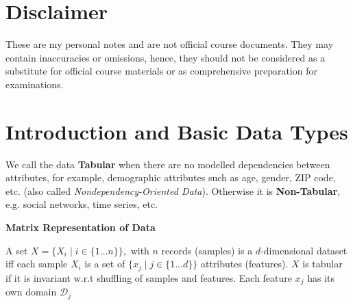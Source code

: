 \documentclass{article}
\begin{document}
\maketitle
\section*{Disclaimer}

These are my personal notes and are not official course documents. They may contain inaccuracies or omissions, hence, they should not be considered as a substitute for official course materials or as comprehensive preparation for examinations.

\tableofcontents

\clearpage
\section{Introduction and Basic Data Types}
We call the data \textbf{Tabular} when there are no modelled dependencies between attributes, for example, demographic attributes such as age, gender, ZIP code, etc. (also called \textit{Nondependency-Oriented Data}). Otherwise it is \textbf{Non-Tabular}, e.g. social networks, time series, etc.

\textbf{Matrix Representation of Data}

A set  $X = \{ X_i \mid  i \in \{1 \dots n \}\}, $ with $n$ records (samples) is a $d$-dimensional dataset iff each sample $X_i$ is a set of $\{ x_j \mid j \in \{ 1 \dots d\} \}$ attributes (features). $X$ is tabular if it is invariant w.r.t shuffling of samples and features. Each feature $x_j$ has its own domain $\mathcal{D}_j$



\end{document}

